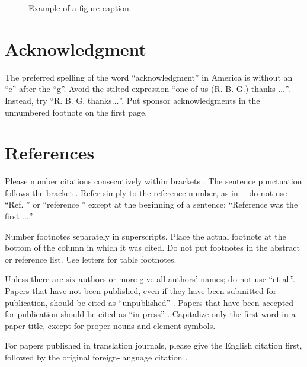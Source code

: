 \documentclass[conference]{IEEEtran}
\begin{document}
\begin{figure}[htbp]

\caption{Example of a figure caption.}
\label{fig}
\end{figure}


\pagebreak
\section*{Acknowledgment}

The preferred spelling of the word ``acknowledgment'' in America is without 
an ``e'' after the ``g''. Avoid the stilted expression ``one of us (R. B. 
G.) thanks $\ldots$''. Instead, try ``R. B. G. thanks$\ldots$''. Put sponsor 
acknowledgments in the unnumbered footnote on the first page.

\section*{References}

Please number citations consecutively within brackets \cite{b1}. The 
sentence punctuation follows the bracket \cite{b2}. Refer simply to the reference 
number, as in \cite{b3}---do not use ``Ref. \cite{b3}'' or ``reference \cite{b3}'' except at 
the beginning of a sentence: ``Reference \cite{b3} was the first $\ldots$''

Number footnotes separately in superscripts. Place the actual footnote at 
the bottom of the column in which it was cited. Do not put footnotes in the 
abstract or reference list. Use letters for table footnotes.

Unless there are six authors or more give all authors' names; do not use 
``et al.''. Papers that have not been published, even if they have been 
submitted for publication, should be cited as ``unpublished'' \cite{b4}. Papers 
that have been accepted for publication should be cited as ``in press'' \cite{b5}. 
Capitalize only the first word in a paper title, except for proper nouns and 
element symbols.

For papers published in translation journals, please give the English 
citation first, followed by the original foreign-language citation \cite{b6}.
\end{document}
